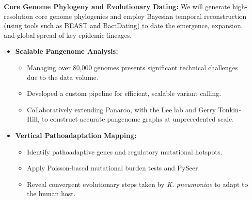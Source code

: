 \documentclass{article}
\begin{document}
\textbf{Core Genome Phylogeny and Evolutionary Dating:} We will generate high-resolution core genome phylogenies and employ Bayesian temporal reconstruction (using tools such as BEAST and BactDating) to date the emergence, expansion, and global spread of key epidemic lineages.
\begin{itemize}
  \item \textbf{Scalable Pangenome Analysis:} 
    \begin{itemize}
      \item Managing over 80{,}000 genomes presents significant technical challenges due to the data volume.
      \item Developed a custom pipeline for efficient, scalable variant calling.
      \item Collaboratively extending Panaroo, with the Lee lab and Gerry Tonkin-Hill, to construct accurate pangenome graphs at unprecedented scale.
    \end{itemize}
  \item \textbf{Vertical Pathoadaptation Mapping:} 
    \begin{itemize}
      \item Identify pathoadaptive genes and regulatory mutational hotspots.
      \item Apply Poisson-based mutational burden tests and PySeer.
      \item Reveal convergent evolutionary steps taken by \textit{K. pneumoniae} to adapt to the human host.
    \end{itemize}
\end{itemize}
\end{document}
